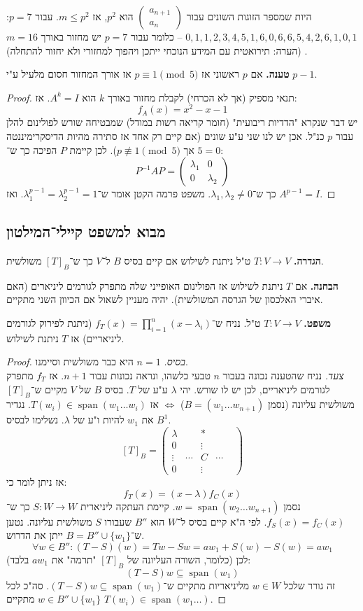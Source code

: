 \documentclass[]{article}
\DeclareMathOperator{\Sp}     {span}
\newcommand\co        {\colon}
\newcommand\pms[1]    {\begin{pmatrix}
		#1
\end{pmatrix}}
\renewcommand\lg      {\lambda}
\newcommand\op    {^{-1}}
\theoremstyle{definition}
\begin{document}
	היות שמספר הזוגות השונים עבור $\pms{a_{n + 1} \\ a_n}$ הוא $p^2$, אז $m \le p^2$. עבור $p = 7$: \hfill $0, 1, 1, 2, 3, 4, 5, 1, 6, 0, 6, 6, 5, 4, 2, 6, 1, 0, 1$ – כלומר עבור $p = 7$ יש מחזור באורך $m = 16$. (הערה: תירואטית עם המידע הנוכחי ייתכן ויהפוך למחזורי ולא יחזור להתחלה)
	
	\textbf{טענה. }אם $p$ ראשוני אז $p \equiv 1 \pmod 5$ אז אורך המחזור חסום מלעיל ע"י $p - 1$. 
	
	\begin{proof}
		תנאי מספיק (אך לא הכרחי) לקבלת מחזור באורך $k$ הוא $A^k = I$. אז: 
		\[ f_A(x) = x^2 - x - 1 \]
		יש דבר שנקרא "הדדיות ריבועית" (חומר קריאה רשות במודל) שמבטיחה שורש לפולינום להלן עבור $p$ כנ"ל. אכן יש לנו שני ע"ע שונים (אם קיים רק אחד אז סתירה מהיות הדיסקרימיננטה $5 = 0$ אך $p \not\equiv 1 \pmod 5$). לכן קיימת $P$ הפיכה כך ש־: 
		\[ P\op AP = \pms{\lg_1 & 0 \\ 0 & \lg_2} \]
		כך ש־$\lg_1, \lg_2 \neq 0$. משפט פרמה הקטן אומר ש־$\lg_1^{p - 1}  = \lg_2^{p - 1} = 1$. ואז $A^{p - 1} = I$. 
	\end{proof}
	
	\subsection{מבוא למשפט קיילי־המילטון}
	\textbf{הגדרה. }$T \co V \to V$ ט"ל ניתנת לשילוש אם קיים בסיס $B$ ל־$V$ כך ש־$[T]_B$ משולשית. 
	
	\textbf{הבחנה. }אם $T$ ניתנת לשילוש אז הפולינום האופייני שלה מתפרק לגורמים ליניארים (האם איברי האלכסון של הגרסה המשולשית). יהיה מעניין לשאול אם הכיוון השני מתקיים. 
	
	\textbf{משפט. }$T \co V \to V$ ט"ל. נניח ש־$f_T(x) = \prod_{i = 1}^{n}(x - \lg_i)$ (ניתנת לפירוק לגורמים ליניאריים) אז $T$ ניתנת לשילוש. \begin{proof}
		\textit{בסיס. }$n = 1$ היא כבר משולשית וסיימנו. \\
		\textit{צעד. }נניח שהטענה נכונה בעבור $n$ טבעי כלשהו, ונראה נכונות עבור $n + 1$. אז $f_T$ מתפרק לגורמים ליניאריים, לכן יש לו שורש. יהי $\lg$ ע"ע של $T$. בסיס $B$ של $V$ מקיים ש־$[T]_B$ משולשית עליונה (נסמן $B = (w_1 \dots w_{n + 1})$) $\iff$ אז $T(w_i) \in \Sp(w_1 \dots w_i)$. נגדיר את $w_1$ להיות ו"ע של $\lg$. נשלימו לבסיס $B^1$. 
		\[ [T]_B = \pms{\lg & & * && \\ 0 && \vdots \\ \vdots &\cdots & C & \cdots \\ 0 & &\vdots } \]
		אז ניתן לומר כי: 
		\[ f_T(x) = (x - \lg) f_C(x) \]
		נסמן $w = \Sp(w_2 \dots w_{n + 1})$. קיימת העתקה ליניארית $S \co W \to W$ כך ש־$f_S(x) = f_C(x)$. לפי ה"א קיים בסיס ל־$W$ הוא $B''$ שעבורו $S$ משולשית עליונה. נטען ש־$B = B'' \cup \{w_1\}$ ייתן את הדרוש. 
		\[ \forall w \in B'' \co (T - S)(w) = Tw - Sw = aw_1 + S(w) - S(w) = aw_1 \]
		(כלומר, השורה העליונה של $[T]_B$ "תרמה" את $aw_1$ בלבד)
		לכן: 
		\[ (T - S)w \subseteq \Sp(w_1) \]
		זה גורר שלכל $w \in W$ מליניאריות מתקיים ש־$(T - S)w \subseteq \Sp(w_1)$. סה"כ לכל $w \in B'' \cup \{w_1\}$ מתקיים $T(w_i) \in \Sp(w_1 \dots)$. 
	\end{proof}
	
\end{document}
